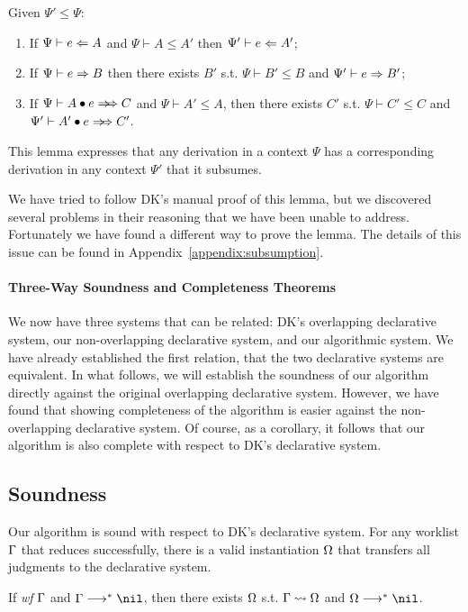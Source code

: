 \begin{lemma}[Subsumption]\label{lem:subsumption}
Given $\Psi' \le \Psi$:
\begin{enumerate}
    \item If $\Psi \vdash e \Leftarrow A$ and $\Psi \vdash A \le A'$ then $\Psi' \vdash e \Leftarrow A'$;
    \item If $\Psi \vdash e \Rightarrow B$ then there exists
        $B'$ s.t. $\Psi \vdash B' \le B$ and $\Psi' \vdash e \Rightarrow B'$;
    \item If $\Psi \vdash \appInf{A}{e}{C}$ and $\Psi \vdash A' \le A$,
        then there exists $C'$ s.t. $\Psi \vdash C' \le C$ and $\Psi' \vdash \appInf{A'}{e}{C'}$.
\end{enumerate}
\end{lemma}
This lemma expresses that any derivation in a context $\Psi$ has a corresponding derivation in any context
$\Psi'$ that it subsumes.

We have tried to follow DK's manual proof of this lemma,
but we discovered several problems in their reasoning that we have been unable to address.
Fortunately we have found a different way to prove the lemma.
The details of this issue can be found in Appendix~\ref{appendix:subsumption}.

\paragraph{Three-Way Soundness and Completeness Theorems}
We now have three systems that can be related: DK's overlapping declarative system,
our non-overlapping declarative system, and our algorithmic system.
We have already established the first relation, that the two declarative
systems are equivalent.
In what follows, we will establish the soundness of our algorithm directly
against the original overlapping declarative system. However, we have found
that showing completeness of the algorithm is easier against the
non-overlapping declarative system. Of course, as a corollary, it follows that
our algorithm is also complete with respect to DK's declarative system.

\subsection{Soundness}

Our algorithm is sound with respect to DK's declarative system.
For any worklist $\Gamma$ that reduces successfully,
there is a valid instantiation $\Omega$ that transfers all judgments
to the declarative system.
\begin{theorem}[Soundness]
If \emph{wf }$\Gamma$ and $\Gm \redto \nil$,
then there exists $\Omega$ s.t. $\Gamma\rightsquigarrow\Omega$ and $\Om\redto\nil$.
\end{theorem}

